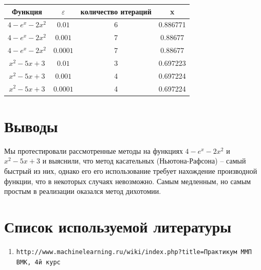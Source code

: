 \documentclass{article}
\begin{document}
			\begin{tabular}{|c|c|c|c|}
				\hline
				
				Функция & $\varepsilon$ & количество итераций & x\\
								
				\hline
				$4- e^x - 2x^2$ & $0.01$ & 6 & 0.886771\\
				
				\hline
				$4- e^x - 2x^2$ & $0.001$ & 7 & 0.88677\\
				\hline
				$4- e^x - 2x^2$ & $0.0001$ & 7 & 0.88677\\
				\hline
				
				
				
				$x^2 - 5x + 3$ & $0.01$ & 3 & 0.697223\\
				
				\hline
				$x^2 - 5x + 3$ & $0.001$ & 4 & 0.697224\\
				\hline
				$x^2 - 5x + 3$ & $0.0001$ & 4 & 0.697224\\
				\hline
				
				
				\end{tabular}
			
		


\section{Выводы}

Мы протестировали рассмотренные методы на функциях $4- e^x - 2x^2$ и $x^2 - 5x + 3$ и выяснили, что метод касательных (Ньютона-Рафсона) -- самый быстрый из них, однако его его использование требует нахождение производной функции, что в некоторых случаях невозможно. Самым медленным, но самым простым в реализации оказался метод дихотомии.  

\section{Список используемой литературы}

\begin{enumerate}
	\item \texttt{http://www.machinelearning.ru/wiki/index.php?title=Практикум ММП ВМК, 4й курс}
\end{enumerate}
\end{document}
